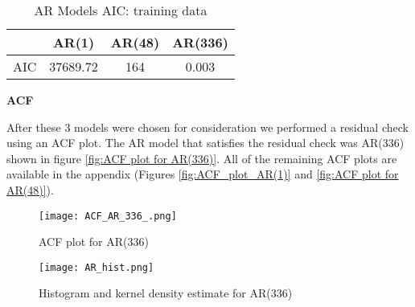 \documentclass[11pt]{article}
\begin{document}





\begin{table}[H]
\centering
\caption{AR Models AIC: training data}
\label{table:hyperparameter_optimisation_results}
\begin{tabular}{@{}cccc@{}}
\toprule
 & \textbf{AR(1)} & \textbf{AR(48)} & \textbf{AR(336)} \\ \midrule
AIC & 37689.72 & 164 & 0.003 \\ \bottomrule

\end{tabular}
\end{table}

\noindent \textbf{ACF}

\noindent After these 3 models were chosen for consideration we performed a residual check using an ACF plot. The AR model that satisfies the residual check was AR(336) shown in figure \ref{fig:ACF plot for AR(336)}. All of the remaining ACF plots are available in the appendix (Figures \ref{fig:ACF_plot_AR(1)} and \ref{fig:ACF plot for AR(48)}). 

\begin{figure}[H]
\centering
\begin{minipage}{.5\textwidth}
  \centering
  \texttt{[image: ACF\_AR\_336\_.png]}
   \caption{ACF plot for AR(336)}
   \label{fig:ACF plot for AR(336)}
\end{minipage}%
\begin{minipage}{.5\textwidth}
  \centering
  \texttt{[image: AR\_hist.png]}
   \caption{Histogram and kernel density estimate for AR(336)}
   \label{fig:Histagram and kernel density estimate for AR(336)}
\end{minipage}
\end{figure}


\end{document}
